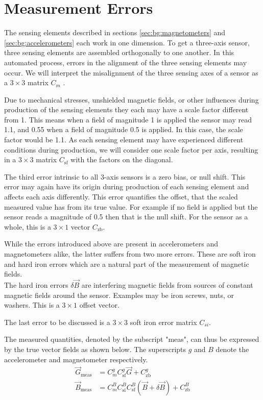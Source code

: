 \section{Measurement Errors \label{sec:bg:measurement_errors}}
The sensing elements described in sections \ref{sec:bg:magnetometers} and \ref{sec:bg:accelerometers} each work in one dimension. To get a three-axis sensor, three sensing elements are assembled orthogonally to one another. In this automated process, errors in the alignment of the three sensing elements may occur. We will interpret the misalignment of the three sensing axes of a sensor as a $3\times3$ matrix $C_{m}$ \parencite{magcal}\parencite{non-orthonogality}.

Due to mechanical stresses, unshielded magnetic fields, or other influences during production of the sensing elements they each may have a scale factor different from 1. This means when a field of magnitude 1 is applied the sensor may read 1.1, and 0.55 when a field of magnitude 0.5 is applied. In this case, the scale factor would be 1.1. As each sensing element may have experienced different conditions during production, we will consider one scale factor per axis, resulting in a $3\times3$ matrix $C_{\mathrm{sf}}$ with the factors on the diagonal.

The third error intrinsic to all 3-axis sensors is a zero bias, or null shift. This error may again have its origin during production of each sensing element and affects each axis differently. This error quantifies the offset, that the scaled measured value has from its true value. For example if no field is applied but the sensor reads a magnitude of 0.5 then that is the null shift. For the sensor as a whole, this is a $3\times1$ vector $C_{\mathrm{zb}}$.

While the errors introduced above are present in accelerometers and magnetometers alike, the latter suffers from two more errors. These are soft iron and hard iron errors which are a natural part of the measurement of magnetic fields.\\
The hard iron errors $\delta\vec{B}$ are interfering magnetic fields from sources of constant magnetic fields around the sensor. Examples may be iron screws, nuts, or washers. This is a $3\times1$ offset vector.

The last error to be discussed is a $3\times3$ soft iron error matrix $C_{si}$.

The measured quantities, denoted by the subscript "meas", can thus be expressed by the true vector fields as shown below. The superscripts $g$ and $B$ denote the accelerometer and magnetometer respectively.
\begin{align}
    \vec{G}_{\mathrm{meas}}&=C^g_mC^g_{\mathrm{sf}}\vec G+C_{\mathrm{zb}}^g \label{eq:bg:g_with_errors}\\
    \vec{B}_{\mathrm{meas}}&=C^B_mC^B_{\mathrm{si}}C^B_{\mathrm{sf}}(\vec{B}+\delta\vec{B})+C_{\mathrm{zb}}^B
    \label{eq:bg:b_with_errors}
\end{align}

